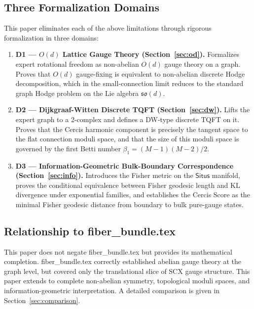 \documentclass[12pt,a4paper]{article}
\theoremstyle{definition}
\theoremstyle{remark}
\theoremstyle{definition}
\newcommand{\Situs}{\textsf{Situs}}
\newcommand{\ZBetti}{\beta_1}
\begin{document}
\subsection{Three Formalization Domains}

This paper eliminates each of the above limitations through rigorous formalization in three domains:

\begin{enumerate}[label=D\arabic*:, leftmargin=*]
    \item \textbf{D1 — $O(d)$ Lattice Gauge Theory (Section~\ref{sec:od}).}
    Formalizes expert rotational freedom as non-abelian $O(d)$ gauge theory on a graph.
    Proves that $O(d)$ gauge-fixing is equivalent to non-abelian discrete Hodge decomposition,
    which in the small-connection limit reduces to the standard graph Hodge problem on the Lie algebra $\mathfrak{so}(d)$.

    \item \textbf{D2 — Dijkgraaf-Witten Discrete TQFT (Section~\ref{sec:dw}).}
    Lifts the expert graph to a 2-complex and defines a DW-type discrete TQFT on it.
    Proves that the Cercis harmonic component is precisely the tangent space to the flat connection moduli space,
    and that the size of this moduli space is governed by the first Betti number $\ZBetti = (M-1)(M-2)/2$.

    \item \textbf{D3 — Information-Geometric Bulk-Boundary Correspondence (Section~\ref{sec:info}).}
    Introduces the Fisher metric on the $\Situs$ manifold, proves the conditional equivalence between Fisher geodesic length and KL divergence under exponential families,
    and establishes the Cercis Score as the minimal Fisher geodesic distance from boundary to bulk pure-gauge states.
\end{enumerate}

\subsection{Relationship to fiber\_bundle.tex}

This paper does not negate fiber\_bundle.tex but provides its mathematical completion. fiber\_bundle.tex correctly established
abelian gauge theory at the graph level, but covered only the translational slice of SCX gauge structure. This paper extends to complete non-abelian symmetry,
topological moduli spaces, and information-geometric interpretation. A detailed comparison is given in Section~\ref{sec:comparison}.
\end{document}
